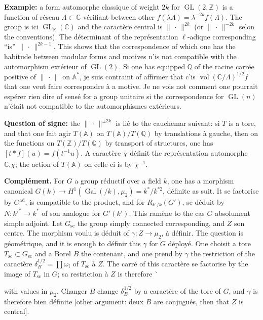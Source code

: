 \documentclass[11pt,a4paper]{article}
\theoremstyle{plain}
\theoremstyle{definition}
\DeclareMathOperator{\Gal}{Gal}
\DeclareMathOperator{\vol}{vol}
\DeclareMathOperator{\GL}{GL}
\newcommand{\norm}[1]{\lVert#1\rVert}
\begin{document}
{{\smallskip
\textbf{Example:} a form automorphe classique of weight $2k$ for $\GL(2,\mathbb Z)$ is a function of r\'{e}seau $\Lambda \subset \mathbb C$ v\'{e}rifiant between other $f(\lambda\Lambda) = \lambda^{-2k}f(\Lambda)$. The group is ici $\GL_{\mathbb R}(\mathbb C)$ and the caract\`{e}re central is $\norm{\,\cdot\,}^{2k}$ (or $\norm{\,\cdot\,}^{-2k}$ selon the conventions). The d\'{e}terminant of the repr\'{e}sentation $\ell$-adique corresponding ``is'' $\norm{\,\cdot\,}^{2k-1}$. This shows that the correspondence of which one has the habitude between modular forms and motives n'is not compatible with the automorphism ext\'{e}rieur of $\GL(2)$. Si one has equipped $\mathbb Q$ of the racine carr\'{e}e positive of $\norm{\,\cdot\,}$ on $\mathbb A^*$, je suis contraint of affirmer that c'is $\vol(\mathbb C/\Lambda)^{1/2} f$ that one veut faire correspondre \`{a} a motive. Je ne vois not comment one pourrait esp\'{e}rer rien dire of sens\'{e} for a group unitaire si the correspondence for $\GL(n)$ n'\'{e}tait not compatible to the automorphismes ext\'{e}rieurs.

\smallskip
\textbf{Question of signe:} the $\norm{\,\cdot\,}^{\pm 2k}$ is li\'{e} to the cauchemar suivant: si $T$ is a tore, and that one fait agir $T(\mathbb A)$ on $T(\mathbb A)/T(\mathbb Q)$ by translations \`{a} gauche, then on the functions on $T(\mathbb Z)/T(\mathbb Q)$ by transport of structures, one has $[t*f](u) = f(t^{-1}u)$. A caract\`{e}re $\chi$ d\'{e}finit the repr\'{e}sentation automorphe $\mathbb C.\chi$; the action of $T(\mathbb A)$ on celle-ci is by $\chi^{-1}$.

\smallskip
\textbf{Compl\'{e}ment.} For $G$ a group r\'{e}ductif over a field $k$, one has a morphism canonical $G(k) \to H^1(\Gal(/k),\mu_2) = k^*/k^{*2}$, d\'{e}finite as suit. It se factorise by $G^{\mathrm{ad}}$, is compatible to the product, and for $R_{k'/k}(G')$, se d\'{e}duit by $N \colon k'^* \to k^*$ of son analogue for $G'(k')$. This ram\`{e}ne to the cas $G$ absolument simple adjoint. Let $G_{\mathrm{sc}}$ the group simply connected corresponding, and $Z$ son centre. The morphism voulu is d\'{e}duit of $\gamma \colon Z \to \mu_2$, \`{a} d\'{e}finir. The question is g\'{e}om\'{e}trique, and it is enough to d\'{e}finir this $\gamma$ for $G$ d\'{e}ploy\'{e}. One choisit a tore $T_{\mathrm{sc}} \subset G_{\mathrm{sc}}$ and a Borel $B$ the contenant, and one prend by $\gamma$ the restriction of the caract\`{e}re $\delta_B^{1/2} = \prod \omega_i$ of $T_{\mathrm{sc}}$ \`{a} $Z$. The carr\'{e} of this caract\`{e}re se factorise by the image of $T_{\mathrm{sc}}$ in $G$; sa restriction \`{a} $Z$ is therefore \`{with values in $\mu_2$. Changer $B$ change $\delta_B^{1/2}$ by a caract\`{e}re of the tore of $G$, and $\gamma$ is therefore bien d\'{e}finite [other argument: deux $B$ are conjugu\'{e}s, then that $Z$ is central].

}}}
\end{document}
